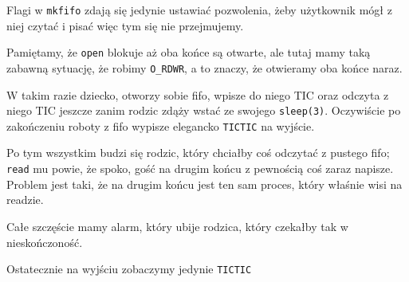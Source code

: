 
Flagi w \texttt{mkfifo} zdają się jedynie ustawiać pozwolenia, żeby użytkownik mógł z niej czytać i pisać więc tym się nie przejmujemy.

Pamiętamy, że \texttt{open} blokuje aż oba końce są otwarte, ale tutaj mamy taką zabawną sytuację, że robimy \texttt{O\_RDWR}, a to znaczy, że otwieramy oba końce naraz.

W takim razie dziecko, otworzy sobie fifo, wpisze do niego TIC oraz odczyta z niego TIC jeszcze zanim rodzic zdąży wstać ze swojego \texttt{sleep(3)}.
Oczywiście po zakończeniu roboty z fifo wypisze elegancko \texttt{TICTIC}
na wyjście.

Po tym wszystkim budzi się rodzic, który chciałby coś odczytać z pustego fifo; \texttt{read} mu powie, że spoko, gość na drugim końcu z pewnością coś zaraz napisze.
Problem jest taki, że na drugim końcu jest ten sam proces, który właśnie wisi na readzie.

Całe szczęście mamy alarm, który ubije rodzica, który czekałby tak w nieskończoność.

Ostatecznie na wyjściu zobaczymy jedynie \texttt{TICTIC}